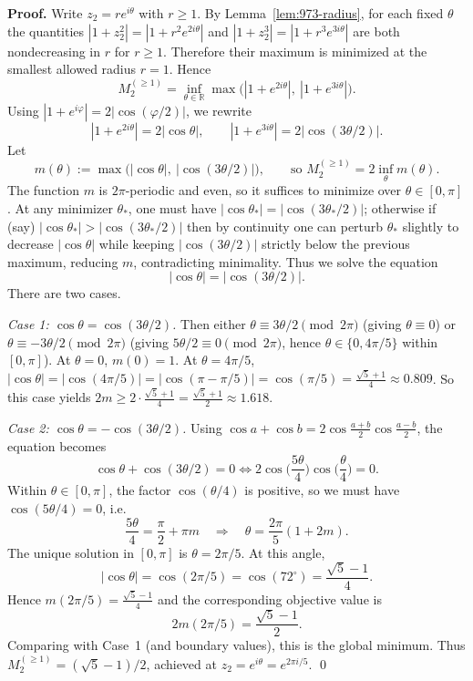 \noindent\textbf{Proof.}
Write $z_2=re^{i\theta}$ with $r\ge 1$.
By Lemma~\ref{lem:973-radius}, for each fixed $\theta$ the quantities $|1+z_2^2|=|1+r^2 e^{2i\theta}|$ and $|1+z_2^3|=|1+r^3 e^{3i\theta}|$ are both nondecreasing in $r$ for $r\ge 1$.
Therefore their maximum is minimized at the smallest allowed radius $r=1$.
Hence
\[
M_2^{(\ge 1)} = \inf_{\theta\in\mathbb{R}} \max\big(|1+e^{2i\theta}|,\ |1+e^{3i\theta}|\big).
\]
Using $|1+e^{i\varphi}|=2|\cos(\varphi/2)|$, we rewrite
\[
|1+e^{2i\theta}|=2|\cos\theta|,\qquad |1+e^{3i\theta}|=2|\cos(3\theta/2)|.
\]
Let
\[
m(\theta):=\max\big(|\cos\theta|,\ |\cos(3\theta/2)|\big),\qquad\text{so }M_2^{(\ge 1)}=2\inf_{\theta} m(\theta).
\]
The function $m$ is $2\pi$-periodic and even, so it suffices to minimize over $\theta\in[0,\pi]$.
At any minimizer $\theta_*$, one must have $|\cos\theta_*|=|\cos(3\theta_*/2)|$; otherwise if (say) $|\cos\theta_*|>|\cos(3\theta_*/2)|$ then by continuity one can perturb $\theta_*$ slightly to decrease $|\cos\theta|$ while keeping $|\cos(3\theta/2)|$ strictly below the previous maximum, reducing $m$, contradicting minimality.
Thus we solve the equation
\[
|\cos\theta|=|\cos(3\theta/2)|.
\]
There are two cases.

\emph{Case 1: $\cos\theta=\cos(3\theta/2)$.}
Then either $\theta\equiv 3\theta/2\pmod{2\pi}$ (giving $\theta\equiv 0$) or $\theta\equiv -3\theta/2\pmod{2\pi}$ (giving $5\theta/2\equiv 0\pmod{2\pi}$, hence $\theta\in\{0,4\pi/5\}$ within $[0,\pi]$).
At $\theta=0$, $m(0)=1$.  At $\theta=4\pi/5$, $|\cos\theta|=|\cos(4\pi/5)|=|\cos(\pi-\pi/5)|=\cos(\pi/5)=\frac{\sqrt5+1}{4}\approx 0.809$.
So this case yields $2m\ge 2\cdot \frac{\sqrt5+1}{4}=\frac{\sqrt5+1}{2}\approx 1.618$.

\emph{Case 2: $\cos\theta=-\cos(3\theta/2)$.}
Using $\cos a+\cos b=2\cos\frac{a+b}{2}\cos\frac{a-b}{2}$, the equation becomes
\[
\cos\theta+\cos(3\theta/2)=0
\iff 2\cos\Big(\frac{5\theta}{4}\Big)\cos\Big(\frac{\theta}{4}\Big)=0.
\]
Within $\theta\in[0,\pi]$, the factor $\cos(\theta/4)$ is positive, so we must have $\cos(5\theta/4)=0$, i.e.
\[
\frac{5\theta}{4}=\frac{\pi}{2}+\pi m \quad\Longrightarrow\quad \theta=\frac{2\pi}{5}(1+2m).
\]
The unique solution in $[0,\pi]$ is $\theta=2\pi/5$.
At this angle,
\[
|\cos\theta|=\cos(2\pi/5)=\cos(72^\circ)=\frac{\sqrt5-1}{4}.
\]
Hence $m(2\pi/5)=\frac{\sqrt5-1}{4}$ and the corresponding objective value is
\[
2m(2\pi/5)=\frac{\sqrt5-1}{2}.
\]
Comparing with Case~1 (and boundary values), this is the global minimum.
Thus $M_2^{(\ge 1)}=(\sqrt5-1)/2$, achieved at $z_2=e^{i\theta}=e^{2\pi i/5}$. \qed

